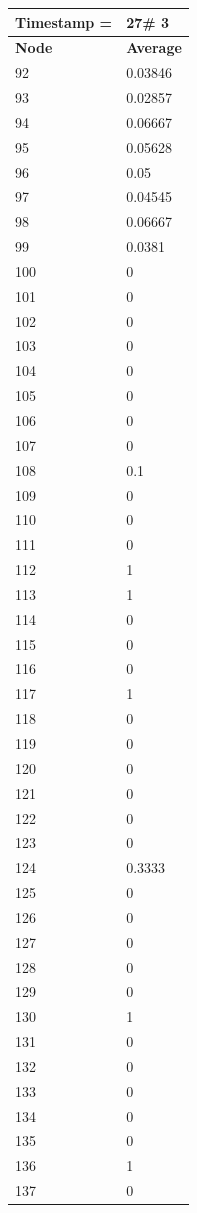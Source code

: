 \begin{tabular}{|l||l|}
\hline
\textbf{Timestamp =} & \textbf{27}\# 3\\\hline
	\textbf{Node} & \textbf{Average} \\ \hline
\hline
	92 & 0.03846 \\ \hline
	93 & 0.02857 \\ \hline
	94 & 0.06667 \\ \hline
	95 & 0.05628 \\ \hline
	96 & 0.05 \\ \hline
	97 & 0.04545 \\ \hline
	98 & 0.06667 \\ \hline
	99 & 0.0381 \\ \hline
	100 & 0 \\ \hline
	101 & 0 \\ \hline
	102 & 0 \\ \hline
	103 & 0 \\ \hline
	104 & 0 \\ \hline
	105 & 0 \\ \hline
	106 & 0 \\ \hline
	107 & 0 \\ \hline
	108 & 0.1 \\ \hline
	109 & 0 \\ \hline
	110 & 0 \\ \hline
	111 & 0 \\ \hline
	112 & 1 \\ \hline
	113 & 1 \\ \hline
	114 & 0 \\ \hline
	115 & 0 \\ \hline
	116 & 0 \\ \hline
	117 & 1 \\ \hline
	118 & 0 \\ \hline
	119 & 0 \\ \hline
	120 & 0 \\ \hline
	121 & 0 \\ \hline
	122 & 0 \\ \hline
	123 & 0 \\ \hline
	124 & 0.3333 \\ \hline
	125 & 0 \\ \hline
	126 & 0 \\ \hline
	127 & 0 \\ \hline
	128 & 0 \\ \hline
	129 & 0 \\ \hline
	130 & 1 \\ \hline
	131 & 0 \\ \hline
	132 & 0 \\ \hline
	133 & 0 \\ \hline
	134 & 0 \\ \hline
	135 & 0 \\ \hline
	136 & 1 \\ \hline
	137 & 0 \\ \hline
\end{tabular}

